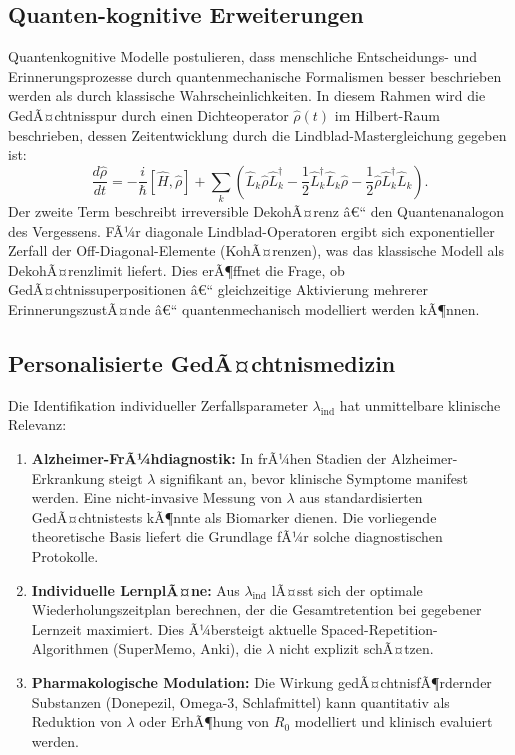 ﻿\documentclass[12pt,a4paper,twoside]{article}
\theoremstyle{theormstyle}
\theoremstyle{proofstyle}
\begin{document}
	\subsection{Quanten-kognitive Erweiterungen}
	
	Quantenkognitive Modelle \citep{busemeyer2012quantum} postulieren,
	dass menschliche Entscheidungs- und Erinnerungsprozesse durch quantenmechanische
	Formalismen besser beschrieben werden als durch klassische Wahrscheinlichkeiten.
	In diesem Rahmen wird die GedÃ¤chtnisspur durch einen Dichteoperator
	$\hat{\rho}(t)$ im Hilbert-Raum beschrieben, dessen Zeitentwicklung
	durch die Lindblad-Mastergleichung gegeben ist:
	\[
	\frac{d\hat{\rho}}{dt}
	= -\frac{i}{\hbar}[\hat{H}, \hat{\rho}]
	+ \sum_k \left(\hat{L}_k \hat{\rho} \hat{L}_k^\dagger
	- \frac{1}{2}\hat{L}_k^\dagger \hat{L}_k \hat{\rho}
	- \frac{1}{2}\hat{\rho} \hat{L}_k^\dagger \hat{L}_k\right).
	\]
	Der zweite Term beschreibt irreversible DekohÃ¤renz â€“ den Quantenanalogon
	des Vergessens. FÃ¼r diagonale Lindblad-Operatoren ergibt sich
	exponentieller Zerfall der Off-Diagonal-Elemente (KohÃ¤renzen),
	was das klassische Modell als DekohÃ¤renzlimit liefert.
	Dies erÃ¶ffnet die Frage, ob GedÃ¤chtnissuperpositionen â€“ gleichzeitige
	Aktivierung mehrerer ErinnerungszustÃ¤nde â€“ quantenmechanisch modelliert
	werden kÃ¶nnen.
	
	\subsection{Personalisierte GedÃ¤chtnismedizin}
	
	Die Identifikation individueller Zerfallsparameter $\lambda_{\mathrm{ind}}$
	hat unmittelbare klinische Relevanz:
	\begin{enumerate}[label=(\arabic*)]
		\item \textbf{Alzheimer-FrÃ¼hdiagnostik:} In frÃ¼hen Stadien der
		Alzheimer-Erkrankung steigt $\lambda$ signifikant an, bevor
		klinische Symptome manifest werden. Eine nicht-invasive Messung
		von $\lambda$ aus standardisierten GedÃ¤chtnistests kÃ¶nnte
		als Biomarker dienen. Die vorliegende theoretische Basis
		liefert die Grundlage fÃ¼r solche diagnostischen Protokolle.
		\item \textbf{Individuelle LernplÃ¤ne:} Aus $\lambda_{\mathrm{ind}}$
		lÃ¤sst sich der optimale Wiederholungszeitplan berechnen,
		der die Gesamtretention bei gegebener Lernzeit maximiert.
		Dies Ã¼bersteigt aktuelle Spaced-Repetition-Algorithmen
		(SuperMemo, Anki), die $\lambda$ nicht explizit schÃ¤tzen.
		\item \textbf{Pharmakologische Modulation:} Die Wirkung gedÃ¤chtnisfÃ¶rdernder
		Substanzen (Donepezil, Omega-3, Schlafmittel) kann quantitativ
		als Reduktion von $\lambda$ oder ErhÃ¶hung von $R_0$ modelliert
		und klinisch evaluiert werden.
	\end{enumerate}
	
\end{document}
